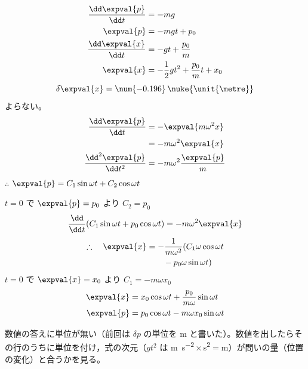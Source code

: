 \begin{align*}
\frac{\dd\expval{p}}{\dd t}&=-mg\\
\expval{p}&=-mgt+p_{0}\\
\frac{\dd\expval{x}}{\dd t}&=-gt+\frac{p_{0}}{m}\\
\expval{x}&=-\frac{1}{2}gt^{2}+\frac{p_{0}}{m}t+x_{0}
\end{align*}
\[ \delta\expval{x}=\num{-0.196}\,\nuke{\unit{\metre}} \]
よらない。
\begin{align*}
\frac{\dd\expval{p}}{\dd t}&=-\expval{m\omega^{2}x}\\
&=-m\omega^{2}\expval{x}\\
\frac{\dd^{2}\expval{p}}{\dd t^{2}}&=-m\omega^{2}\frac{\expval{p}}{m}
\end{align*}
$\therefore$ $\expval{p}=C_{1}\sin\omega t+C_{2}\cos\omega t$

$t=0$ で $\expval{p}=p_{0}$ より $C_{2}=p_{0}$
\[ \frac{\dd}{\dd t}(C_{1}\sin\omega t+p_{0}\cos\omega t)=-m\omega^{2}\expval{x} \]
\begin{align*}
\therefore\quad\expval{x}&=-\frac{1}{m\omega^{2}}(C_{1}\omega\cos\omega t\\
&\qquad-p_{0}\omega\sin\omega t)
\end{align*}
$t=0$ で $\expval{x}=x_{0}$ より $C_{1}=-m\omega x_{0}$
\begin{align*}
\expval{x}&=x_{0}\cos\omega t+\frac{p_{0}}{m\omega}\sin\omega t\\
\expval{p}&=p_{0}\cos\omega t-m\omega x_{0}\sin\omega t
\end{align*}
\item {} 数値の答えに単位が無い（前回は $\delta p$ の単位を \unit{\metre} と書いた）。数値を出したらその行のうちに単位を付け，式の次元（$gt^{2}$ は \unit{\metre\per\second\squared}${}\times{}$\unit{\second\squared}${}={}$\unit{\metre}）が問いの量（位置の変化）と合うかを見る。
